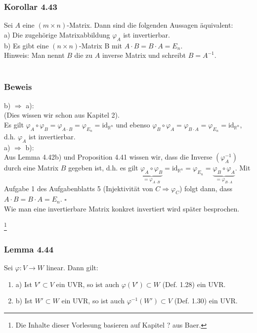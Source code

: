 \documentclass{article}
\begin{document}
\subsubsection*{Korollar 4.43}
Sei $A$ eine $(m \times n)$-Matrix. Dann sind die folgenden Aussagen äquivalent: \\
a) Die zugehörige Matrixabbildung $\varphi_A$ ist invertierbar. \\
b) Es gibt eine $(n \times n)$-Matrix B mit $A \cdot B = B \cdot A = E_n$. \\
Hinweis: Man nennt $B$ die zu $A$ inverse Matrix und schreibt $B = A^{-1}$. \\
\\
\subsubsection*{Beweis}
b) $\Rightarrow$ a): \\
(Dies wissen wir schon aus Kapitel 2).\\
Es gilt $\varphi_A \circ \varphi_B = \varphi_{A \cdot B} = \varphi_{E_n} = \text{id}_{\mathbb{R}^n}$ und ebenso $\varphi_B \circ \varphi_A = \varphi_{B \cdot A} = \varphi_{E_n} = \text{id}_{\mathbb{R}^n}$, d.h. $\varphi_A$ ist invertierbar. \\
a) $\Rightarrow$ b): \\
Aus Lemma 4.42b) und Proposition 4.41 wissen wir, dass die Inverse $(\varphi_A^{-1})$ durch eine Matrix $B$ gegeben ist, d.h. es gilt $\underbrace{\varphi_A \circ \varphi_B}_{=\varphi_{A \cdot B}} = \text{id}_{\mathbb{R}^n} = \varphi_{E_n} = \underbrace{\varphi_B \circ \varphi_A}_{=\varphi_{B \cdot A}}$.
Mit Aufgabe 1 des Aufgabenblatts 5 (Injektivität von $C \Rightarrow \varphi_C$) folgt dann, dass $A \cdot B = B \cdot A = E_n$. $\square$ \\
Wie man eine invertierbare Matrix konkret invertiert wird später besprochen.

\newpage
\date{Mittwoch, 24.01.18} \footnote[1]{Die Inhalte dieser Vorlesung basieren auf Kapitel ? aus Baer.}
\subsubsection*{Lemma 4.44}
Sei $\varphi: V \rightarrow W$ linear. Dann gilt: \\
\begin{enumerate}
    \item a) Ist $V' \subset V$ ein UVR, so ist auch $\varphi(V') \subset W$ (Def. 1.28) ein UVR. \\
    \item b) Ist $W' \subset W$ ein UVR, so ist auch $\varphi^{-1}(W') \subset V$ (Def. 1.30) ein UVR. \\
\end{enumerate}
\end{document}
